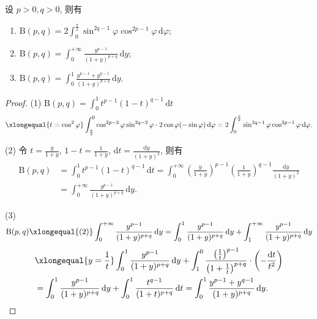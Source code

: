 \begin{example}\label{ex:15.4.1}
设 $p>0, q>0$, 则有
\begin{enumerate}
  \item $\displaystyle\mathrm{B}(p,q)=2\int_{0}^{\frac{\pi}{2}}\sin^{2q-1}\varphi\cos^{2p-1}\varphi\,\mathrm{d}\varphi$;
  \item $\displaystyle\mathrm{B}(p,q)=\int_{0}^{+\infty}\frac{y^{p-1}}{(1+y)^{p+q}}\,\mathrm{d}y$;
  \item $\displaystyle\mathrm{B}(p,q)=\int_{0}^{1}\frac{y^{p-1}+y^{q-1}}{(1+y)^{p+q}}\,\mathrm{d}y$.
\end{enumerate}
\end{example}
\begin{proof}
(1) $\displaystyle\mathrm{B}(p,q)=\int_{0}^{1}t^{p-1}(1-t)^{q-1}\,\mathrm{d}t$
\[
  \xlongequal{t=\cos^{2}\varphi}\int_{\frac{\pi}{2}}^{0}\cos^{2p-2}\varphi\sin^{2q-2}\varphi\cdot 2\cos\varphi(-\sin\varphi)\,\mathrm{d}\varphi
  =2\int_{0}^{\frac{\pi}{2}}\sin^{2q-1}\varphi\cos^{2p-1}\varphi\,\mathrm{d}\varphi.
\]

(2) 令 $t=\frac{y}{1+y}$, $1-t=\frac{1}{1+y}$, $\mathrm{d}t=\frac{\mathrm{d}y}{(1+y)^{2}}$, 则有
\[
  \begin{aligned}
    \mathrm{B}(p,q)&=\int_{0}^{1}t^{p-1}(1-t)^{q-1}\,\mathrm{d}t=\int_{0}^{+\infty}\left(\frac{y}{1+y}\right)^{p-1}\left(\frac{1}{1+y}\right)^{q-1}\frac{\mathrm{d}y}{(1+y)^{2}}\\
    &=\int_{0}^{+\infty}\frac{y^{p-1}}{(1+y)^{p+q}}\,\mathrm{d}y.
  \end{aligned}
\]

(3) $\displaystyle\mathrm{B}(p,q)\xlongequal{(2)}\int_{0}^{+\infty}\frac{y^{p-1}}{(1+y)^{p+q}}\,\mathrm{d}y=\int_{0}^{1}\frac{y^{p-1}}{(1+y)^{p+q}}\,\mathrm{d}y+\int_{1}^{+\infty}\frac{y^{p-1}}{(1+y)^{p+q}}\,\mathrm{d}y$
\[
  \begin{aligned}
    &\xlongequal{y=\frac{1}{t}}\int_{0}^{1}\frac{y^{p-1}}{(1+y)^{p+q}}\,\mathrm{d}y+\int_{1}^{0}\frac{\left(\frac{1}{t}\right)^{p-1}}{\left(1+\frac{1}{t}\right)^{p+q}}\cdot\left(-\frac{\mathrm{d}t}{t^{2}}\right)\\
    &=\int_{0}^{1}\frac{y^{p-1}}{(1+y)^{p+q}}\,\mathrm{d}y+\int_{0}^{1}\frac{t^{q-1}}{(1+t)^{p+q}}\,\mathrm{d}t=\int_{0}^{1}\frac{y^{p-1}+y^{q-1}}{(1+y)^{p+q}}\,\mathrm{d}y.
  \end{aligned}
\]
\end{proof}

